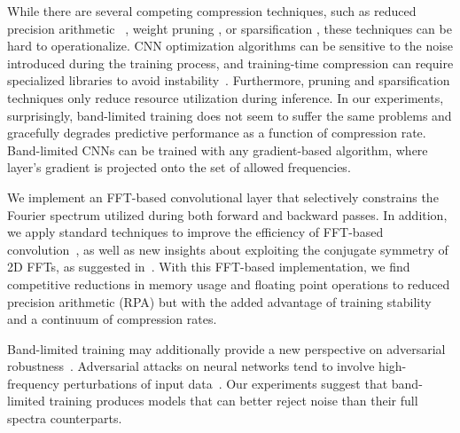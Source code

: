 While there are several competing compression techniques, such as reduced precision arithmetic ~\cite{wang2018training, abergerhigh, hubara2017quantized}, weight pruning \cite{han2015deep}, or sparsification \cite{sparseWinograd},
these techniques can be hard to operationalize.
CNN optimization algorithms can be sensitive to the noise introduced during the training process, and training-time compression can require specialized libraries to avoid instability~\cite{wang2018training, abergerhigh}.
Furthermore, pruning and sparsification techniques only reduce resource utilization during inference.
In our experiments, surprisingly, band-limited training does not seem to suffer the same problems and gracefully degrades predictive performance as a function of compression rate.
Band-limited CNNs can be trained with any gradient-based algorithm, where layer's gradient is projected onto the set of allowed frequencies.

We implement an FFT-based convolutional layer that selectively constrains the Fourier spectrum utilized during both forward and backward passes. In addition, we apply standard techniques to improve the efficiency of FFT-based convolution~\cite{mathieu2013fast}, as well as new insights about exploiting the conjugate symmetry of 2D FFTs, as suggested in~\cite{rippel2015spectral}. 
With this FFT-based implementation, we find competitive reductions in memory usage and floating point operations to reduced precision arithmetic (RPA) but with the added advantage of training stability and a continuum of compression rates.

Band-limited training may additionally provide a new perspective on adversarial robustness~\cite{papernot2015distillation}. Adversarial attacks on neural networks tend to involve high-frequency perturbations of input data~\cite{huang2017adversarial, madry2017towards, papernot2015distillation}.
Our experiments suggest that band-limited training produces models that can better reject noise than their full spectra counterparts. 

